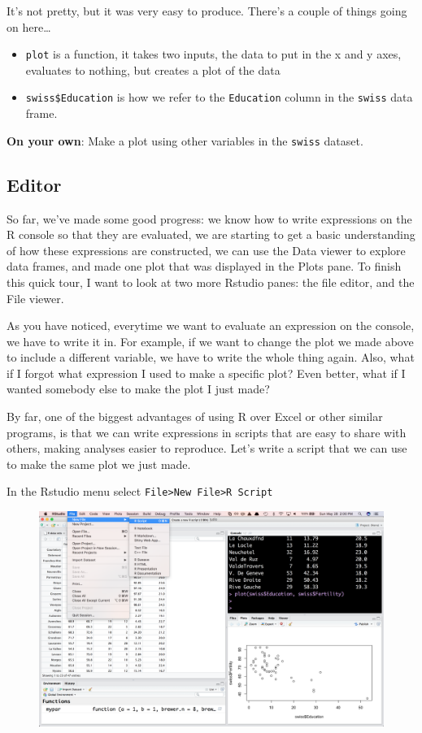 \documentclass[]{book}
\theoremstyle{definition}
\theoremstyle{definition}
\theoremstyle{remark}
\begin{document}
It's not pretty, but it was very easy to produce. There's a couple of
things going on here\ldots{}

\begin{itemize}
\item
  \texttt{plot} is a function, it takes two inputs, the data to put in
  the x and y axes, evaluates to nothing, but creates a plot of the data
\item
  \texttt{swiss\$Education} is how we refer to the \texttt{Education}
  column in the \texttt{swiss} data frame.
\end{itemize}

\textbf{On your own}: Make a plot using other variables in the
\texttt{swiss} dataset.

\subsection{Editor}\label{editor}

So far, we've made some good progress: we know how to write expressions
on the R console so that they are evaluated, we are starting to get a
basic understanding of how these expressions are constructed, we can use
the Data viewer to explore data frames, and made one plot that was
displayed in the Plots pane. To finish this quick tour, I want to look
at two more Rstudio panes: the file editor, and the File viewer.

As you have noticed, everytime we want to evaluate an expression on the
console, we have to write it in. For example, if we want to change the
plot we made above to include a different variable, we have to write the
whole thing again. Also, what if I forgot what expression I used to make
a specific plot? Even better, what if I wanted somebody else to make the
plot I just made?

By far, one of the biggest advantages of using R over Excel or other
similar programs, is that we can write expressions in scripts that are
easy to share with others, making analyses easier to reproduce. Let's
write a script that we can use to make the same plot we just made.

In the Rstudio menu select
\texttt{File\textgreater{}New\ File\textgreater{}R\ Script}

\begin{figure}
\centering
\includegraphics{img/rstudio_new_script.png}
\caption{}
\end{figure}
\end{document}
